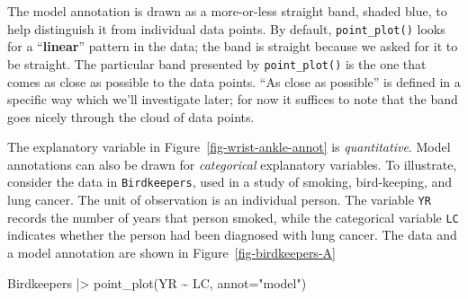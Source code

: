 \documentclass[
  letterpaper,
  DIV=11,
  numbers=noendperiod,
  oneside]{scrartcl}
\newenvironment{Shaded}{\begin{snugshade}}{\end{snugshade}}
\newcommand{\AttributeTok}[1]{\textcolor[rgb]{0.40,0.45,0.13}{#1}}
\newcommand{\FunctionTok}[1]{\textcolor[rgb]{0.28,0.35,0.67}{#1}}
\newcommand{\NormalTok}[1]{\textcolor[rgb]{0.00,0.23,0.31}{#1}}
\newcommand{\SpecialCharTok}[1]{\textcolor[rgb]{0.37,0.37,0.37}{#1}}
\newcommand{\StringTok}[1]{\textcolor[rgb]{0.13,0.47,0.30}{#1}}
\begin{document}
The model annotation is drawn as a more-or-less straight band, shaded
blue, to help distinguish it from individual data points. By default,
\texttt{point\_plot()} looks for a ``\textbf{linear}'' pattern in the
data; the band is straight because we asked for it to be straight. The
particular band presented by \texttt{point\_plot()} is the one that
comes as close as possible to the data points. ``As close as possible''
is defined in a specific way which we'll investigate later; for now it
suffices to note that the band goes nicely through the cloud of data
points.

The explanatory variable in Figure~\ref{fig-wrist-ankle-annot} is
\emph{quantitative}. Model annotations can also be drawn for
\emph{categorical} explanatory variables. To illustrate, consider the
data in \texttt{Birdkeepers}, used in a study of smoking, bird-keeping,
and lung cancer. The unit of observation is an individual person. The
variable \texttt{YR} records the number of years that person smoked,
while the categorical variable \texttt{LC} indicates whether the person
had been diagnosed with lung cancer. The data and a model annotation are
shown in Figure~\ref{fig-birdkeepers-A}

\begin{Shaded}
\begin{Highlighting}[]
\NormalTok{Birdkeepers }\SpecialCharTok{|\textgreater{}} \FunctionTok{point\_plot}\NormalTok{(YR }\SpecialCharTok{\textasciitilde{}}\NormalTok{ LC, }\AttributeTok{annot=}\StringTok{"model"}\NormalTok{)}
\end{Highlighting}
\end{Shaded}

\begin{figure}



\end{figure}%
\end{document}
